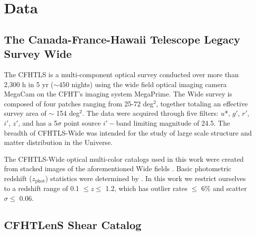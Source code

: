 
\section{Data}
\label{data}


\subsection{The Canada-France-Hawaii Telescope Legacy Survey Wide}

The \acf{CFHTLS} is a multi-component optical survey conducted over more than 2,300 h in 5 yr ($\sim450$ nights) using the wide field optical imaging camera MegaCam on the \ac{CFHT}'s imaging system MegaPrime. The Wide survey is composed of four patches ranging from 25-72 deg$^2$, together totaling an effective survey area of $\sim$ 154 deg$^2$. The data were acquired through five filters: $u$*, $g'$, $r'$, $i'$, $z'$, and has a 5$\sigma$ point source $i'-$band limiting magnitude of 24.5. The breadth of \ac{CFHTLS}-Wide was intended for the study of large scale structure and matter distribution in the Universe.

The \ac{CFHTLS}-Wide optical multi-color catalogs used in this work were created from stacked images of the aforementioned Wide fields \citep[see][for details on the data processing and multi-color catalog creation]{Erben09, Hildebrandt09a, Hildebrandt12, Erben13}. Basic photometric redshift ($z_{\mathrm{phot}}$) statistics were determined by \citet{Hildebrandt12}. In this work we restrict ourselves to a redshift range of 0.1 $\leq z \leq$ 1.2, which has outlier rates $\leq$ 6\% and scatter $\sigma \leq$ 0.06.


\subsection{\ac{CFHTLenS} Shear Catalog}

